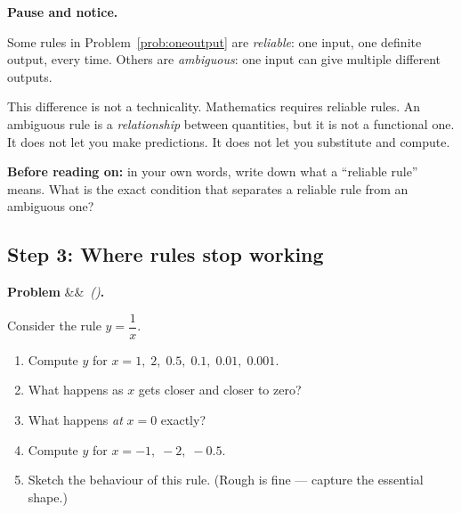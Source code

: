 \documentclass[12pt, a4paper]{article}
\newcounter{problem}
\newenvironment{problem}[1][]{%
  \refstepcounter{problem}%
  \par\vspace{6pt}%
  \noindent\textbf{\color{MidBlue}Problem \theproblem}%
  \ifx&#1&\else\ \textit{(#1)}\fi\textbf{.}\enskip
}{\par\vspace{4pt}}
\begin{document}
\begin{discoverybox}
\textbf{Pause and notice.}

Some rules in Problem~\ref{prob:oneoutput} are \emph{reliable}: one input, one definite output, every time. Others are \emph{ambiguous}: one input can give multiple different outputs.

This difference is not a technicality. Mathematics requires reliable rules. An ambiguous rule is a \emph{relationship} between quantities, but it is not a functional one. It does not let you make predictions. It does not let you substitute and compute.

\medskip
\textbf{Before reading on:} in your own words, write down what a ``reliable rule'' means. What is the exact condition that separates a reliable rule from an ambiguous one?
\end{discoverybox}

\subsection{Step 3: Where rules stop working}

\begin{problem}
Consider the rule $\displaystyle y = \dfrac{1}{x}$.
\begin{enumerate}[label=(\alph*), topsep=2pt]
  \item Compute $y$ for $x = 1,\; 2,\; 0.5,\; 0.1,\; 0.01,\; 0.001$.
  \item What happens as $x$ gets closer and closer to zero?
  \item What happens \emph{at} $x = 0$ exactly?
  \item Compute $y$ for $x = -1,\; -2,\; -0.5$.
  \item Sketch the behaviour of this rule. (Rough is fine --- capture the essential shape.)
\end{enumerate}
\end{problem}

\begin{center}
\end{center}
\end{document}
